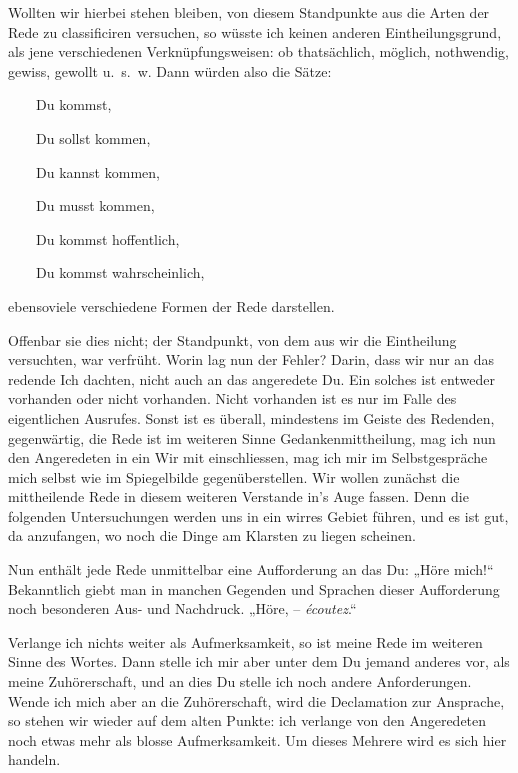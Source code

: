 Wollten wir hierbei stehen bleiben, von diesem Standpunkte aus die Arten der Rede zu classificiren versuchen, so wüsste ich keinen anderen Eintheilungs\-\label{sp.318}grund, als jene verschiedenen Verknüpfungsweisen: ob thatsächlich, möglich, nothwendig, gewiss, gewollt u.~s.~w. Dann würden also die Sätze:

~~~~Du kommst,

~~~~Du sollst kommen,

~~~~Du kannst kommen, 

~~~~Du musst kommen, 

~~~~Du kommst hoffentlich, 

~~~~Du kommst wahrscheinlich, 

\largerpage[-1]\noindent ebensoviele verschiedene Formen der Rede darstellen.

Offenbar  sie dies nicht; der Standpunkt, von dem aus wir die Eintheilung versuchten, war verfrüht. Worin lag nun der Fehler? Darin, dass wir nur an das redende Ich dachten, nicht auch an das angeredete Du. Ein solches ist entweder vorhanden oder nicht vorhanden. Nicht vorhanden ist es nur im Falle des eigentlichen Ausrufes. Sonst ist es überall, mindestens im Geiste des Redenden, gegenwärtig, die Rede ist im weiteren Sinne Gedankenmittheilung, mag ich nun den Angeredeten in ein Wir mit einschliessen, mag ich mir im Selbstgespräche mich selbst \label{fp.309} wie im Spiegelbilde gegenüberstellen. Wir wollen zunächst die mittheilende Rede in diesem weiteren Verstande in’s Auge fassen. Denn die folgenden Untersuchungen werden uns in ein wirres Gebiet führen, und es ist gut, da anzufangen, wo noch die Dinge am Klarsten zu liegen scheinen.

Nun enthält jede Rede unmittelbar eine Aufforderung an das Du: „Höre mich!“ Bekanntlich giebt man in manchen Gegenden und Sprachen dieser Aufforderung noch besonderen Aus- und Nachdruck. „Höre, – \textit{écoutez}.“

Verlange ich nichts weiter als Aufmerksamkeit, so ist meine Rede  im weiteren Sinne des Wortes. Dann stelle ich mir aber unter dem Du jemand anderes vor, als meine Zuhörerschaft, und an dies Du stelle ich noch andere Anforderungen. Wende ich mich aber an die Zuhörerschaft, wird die Declamation zur Ansprache, so stehen wir wieder auf dem alten Punkte: ich verlange von den Angeredeten noch etwas mehr als blosse Aufmerksamkeit. Um dieses Mehrere wird es sich hier handeln.

